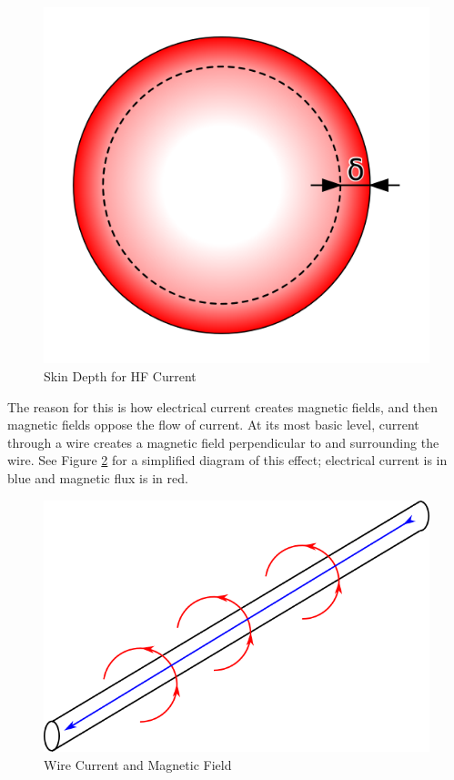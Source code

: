 \begin{figure}[h]
\centering
\includegraphics[scale=0.5]{skin_depth.png}
\caption{Skin Depth for HF Current}\label{skin_depth}
\end{figure}

The reason for this is how electrical current creates magnetic fields, and then magnetic fields oppose the flow of current. At its most basic level, current through a wire creates a magnetic field perpendicular to and surrounding the wire. See Figure \ref{wire_mag_field} for a simplified diagram of this effect; electrical current is in blue and magnetic flux is in red.

\begin{figure}[h]
\centering
\includegraphics[scale=0.5]{wire_mag_field.png}
\caption{Wire Current and Magnetic Field}\label{wire_mag_field}
\end{figure}

